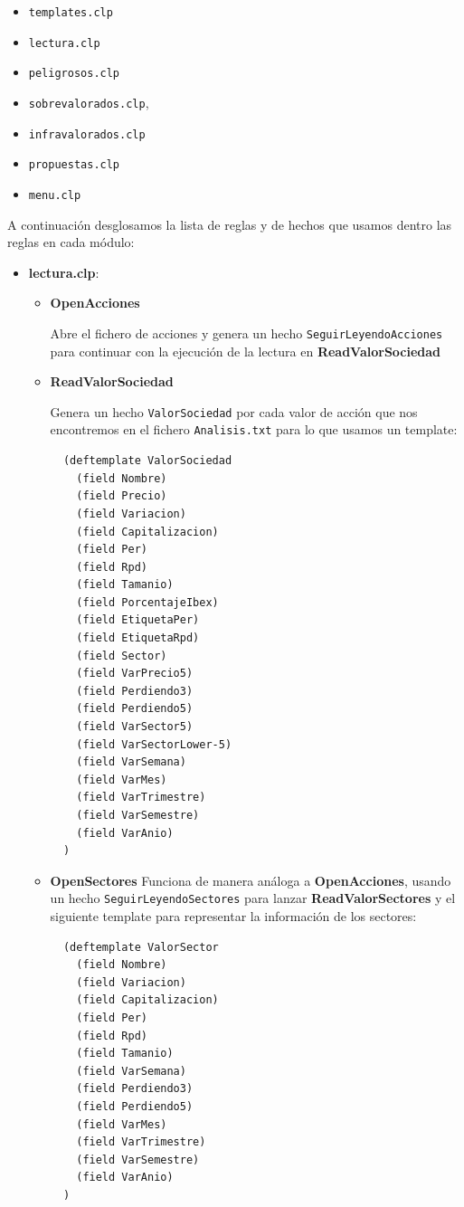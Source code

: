 \documentclass[a4paper,11pt]{article}
\begin{document}
\begin{itemize}
\item \texttt{templates.clp}
\item \texttt{lectura.clp}
\item \texttt{peligrosos.clp}
\item \texttt{sobrevalorados.clp},
\item \texttt{infravalorados.clp}
\item \texttt{propuestas.clp}
\item \texttt{menu.clp}
\end{itemize}

A continuación desglosamos la lista de reglas y de hechos que usamos dentro las reglas en cada módulo:

\begin{itemize}
 \item \textbf{lectura.clp}:
 \begin{itemize}
  \item \textbf{OpenAcciones}
  
  Abre el fichero de acciones y genera un hecho \texttt{SeguirLeyendoAcciones} para continuar con la ejecución de la lectura
  en \textbf{ReadValorSociedad}
  
  \item \textbf{ReadValorSociedad}
  
  Genera un hecho \texttt{ValorSociedad} por cada valor de acción que nos encontremos en el fichero \texttt{Analisis.txt}
  para lo que usamos un template:
  \begin{verbatim}
  (deftemplate ValorSociedad
    (field Nombre)
    (field Precio)
    (field Variacion)
    (field Capitalizacion)
    (field Per)
    (field Rpd)
    (field Tamanio)
    (field PorcentajeIbex)
    (field EtiquetaPer)
    (field EtiquetaRpd)
    (field Sector)
    (field VarPrecio5)
    (field Perdiendo3)
    (field Perdiendo5)
    (field VarSector5)
    (field VarSectorLower-5)
    (field VarSemana)
    (field VarMes)
    (field VarTrimestre)
    (field VarSemestre)
    (field VarAnio)
  )
  \end{verbatim}
  
  \item \textbf{OpenSectores} Funciona de manera análoga a \textbf{OpenAcciones}, usando un hecho \texttt{SeguirLeyendoSectores}
  para lanzar \textbf{ReadValorSectores} y el siguiente template para representar la información de los sectores:
  \begin{verbatim}
  (deftemplate ValorSector
    (field Nombre)
    (field Variacion)
    (field Capitalizacion)
    (field Per)
    (field Rpd)
    (field Tamanio)
    (field VarSemana)
    (field Perdiendo3)
    (field Perdiendo5)
    (field VarMes)
    (field VarTrimestre)
    (field VarSemestre)
    (field VarAnio)
  )
  \end{verbatim}


\end{itemize}
\end{itemize}
\end{document}
